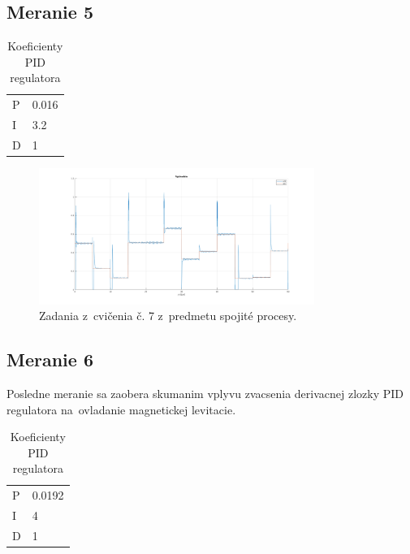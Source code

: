 \documentclass{article}
\begin{document}
\subsection{Meranie 5}
\label{sec:meranie5}

\begin{table}[!htbp]
	\caption{Koeficienty PID regulatora}
	\label{tab:t5}
	\begin{center}
		\begin{tabular}[c]{|l|l|}
			\hline

			P & 0.016 \\
			I & 3.2 \\
			D & 1 \\
			\hline
		\end{tabular}
	\end{center}
\end{table}

\begin{figure}[!htbp]
	\begin{center}
		\includegraphics[width=0.8\textwidth]{./include/m5.png}
	\end{center}
	\caption{Zadania z~cvičenia č. 7 z~predmetu spojité procesy.}
	\label{fig:meranie5}
\end{figure}

\subsection{Meranie 6}
\label{sec:meranie6}


Posledne meranie sa zaobera skumanim vplyvu zvacsenia derivacnej zlozky PID regulatora na~ovladanie magnetickej levitacie.



\begin{table}[!htbp]
	\caption{Koeficienty PID regulatora}
	\label{tab:t6}
	\begin{center}
		\begin{tabular}[c]{|l|l|}
			\hline

			P & 0.0192 \\
			I & 4 \\
			D & 1 \\
			\hline
		\end{tabular}
	\end{center}
\end{table}
\end{document}
